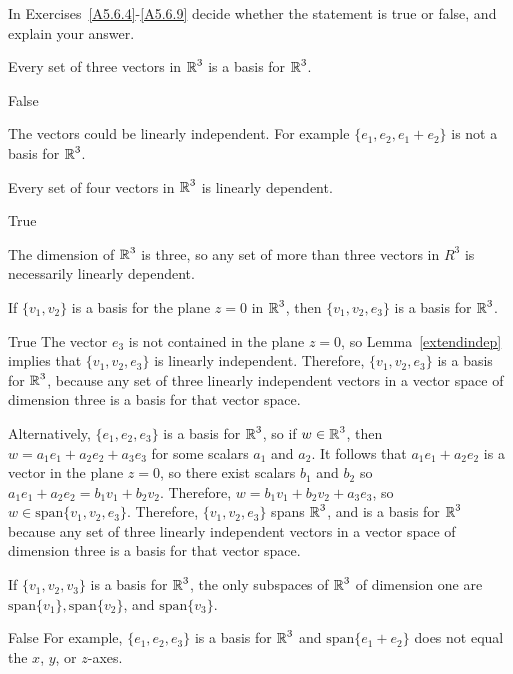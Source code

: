 \documentclass{ximera}
\begin{document}
In Exercises~\ref{A5.6.4}-\ref{A5.6.9} decide whether the statement is true or false, and explain your answer.

\begin{exercise}  \label{A5.6.4}
Every set of three vectors in $\mbox{$\Bbb{R}$}^3$ is a basis for $\mbox{$\Bbb{R}$}^3$.
\begin{solution}
\ans False  

\soln
The vectors could be linearly independent. For example $\{e_1,e_2,e_1+e_2\}$ is not a basis for $\mbox{$\Bbb{R}$}^3$.
\end{solution}
\end{exercise}

\begin{exercise}  \label{A5.6.5}
Every set of four vectors in $\mbox{$\Bbb{R}$}^3$ is linearly dependent.
\begin{solution}
\ans True

\soln
The dimension of $\mbox{$\Bbb{R}$}^3$ is three, so any set of more than three vectors in $R^3$ is necessarily linearly dependent.
\end{solution}
\end{exercise}

\begin{exercise}  \label{A5.6.6}
If $\{v_1,v_2\}$ is a basis for the plane $z = 0$ in $\mbox{$\Bbb{R}$}^3$, then $\{v_1,v_2,e_3\}$ is a basis for $\mbox{$\Bbb{R}$}^3$.
\begin{solution}
\ans True
\soln
The vector $e_3$ is not contained in the plane $z=0$, so Lemma~\ref{extendindep} implies that $\{v_1,v_2,e_3\}$  is linearly independent. Therefore, $\{v_1,v_2,e_3\}$  is a basis for $\mbox{$\Bbb{R}$}^3$, because any set of three linearly independent vectors in a vector space of dimension three is a basis for that vector space. 

Alternatively, $\{e_1,e_2,e_3\}$ is a basis for $\mbox{$\Bbb{R}$}^3$, so if $w\in \mbox{$\Bbb{R}$}^3$, then $w = a_1 e_1 +a_2 e_2 +a_3 e_3$ for some scalars $a_1$ and $a_2$. It follows that $a_1 e_1 + a_2 e_2$ is a vector in the plane $z=0$, so there exist scalars $b_1$ and $b_2$ so $a_1 e_1+ a_2 e_2 = b_1 v_1 +b_2 v_2$. Therefore, $w = b_1 v_1 + b_2 v_2 + a_3 e_3$, so $w\in \text{span}\{v_1,v_2,e_3\}$. Therefore, $\{v_1,v_2,e_3\}$ spans $\mbox{$\Bbb{R}$}^3$, and is a basis for $\mbox{$\Bbb{R}$}^3$ because any set of three linearly independent vectors in a vector space of dimension three is a basis for that vector space. 
\end{solution}
\end{exercise}

\begin{exercise}  \label{A5.6.7}
If $\{v_1,v_2,v_3\}$ is a basis for $\mbox{$\Bbb{R}$}^3$, the only subspaces of $\mbox{$\Bbb{R}$}^3$ of dimension one are $\text{span}\{v_1\}, \text{span}\{v_2\}$, and $\text{span}\{v_3\}$. 
\begin{solution}
\ans False 
\soln For example, $\{e_1,e_2,e_3\}$ is a basis for $\mbox{$\Bbb{R}$}^3$ and $\text{span}\{e_1+e_2\}$ does not equal the $x$, $y$, or $z$-axes.
\end{solution}
\end{exercise}
\end{document}
